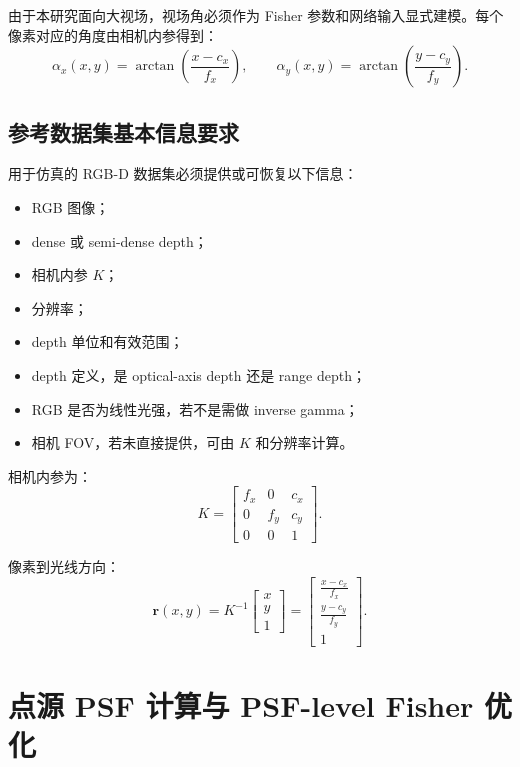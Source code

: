 \documentclass[11pt,a4paper,fontset=none]{ctexart}
\begin{document}
由于本研究面向大视场，视场角必须作为 Fisher 参数和网络输入显式建模。每个像素对应的角度由相机内参得到：
\begin{equation}
  \alpha_x(x,y)=
  \arctan\left(\frac{x-c_x}{f_x}\right),
  \qquad
  \alpha_y(x,y)=
  \arctan\left(\frac{y-c_y}{f_y}\right).
\end{equation}

\subsection{参考数据集基本信息要求}

用于仿真的 RGB-D 数据集必须提供或可恢复以下信息：
\begin{itemize}
  \item RGB 图像；
  \item dense 或 semi-dense depth；
  \item 相机内参 $K$；
  \item 分辨率；
  \item depth 单位和有效范围；
  \item depth 定义，是 optical-axis depth 还是 range depth；
  \item RGB 是否为线性光强，若不是需做 inverse gamma；
  \item 相机 FOV，若未直接提供，可由 $K$ 和分辨率计算。
\end{itemize}

相机内参为：
\begin{equation}
  K=
  \begin{bmatrix}
  f_x&0&c_x\\
  0&f_y&c_y\\
  0&0&1
  \end{bmatrix}.
\end{equation}

像素到光线方向：
\begin{equation}
  \bm r(x,y)=
  K^{-1}
  \begin{bmatrix}
  x\\y\\1
  \end{bmatrix}
  =
  \begin{bmatrix}
  \frac{x-c_x}{f_x}\\
  \frac{y-c_y}{f_y}\\
  1
  \end{bmatrix}.
\end{equation}

\section{点源 PSF 计算与 PSF-level Fisher 优化}
\end{document}

